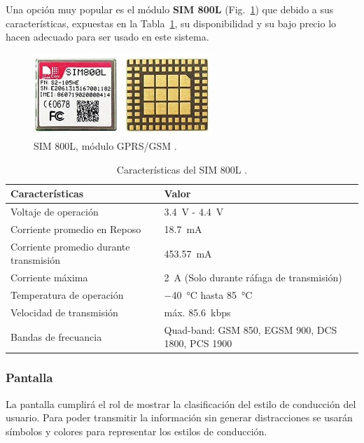Una opción muy popular es el módulo \textbf{SIM 800L} (Fig.~\ref{fig:SIM}) que debido a sus características, expuestas en la Tabla~\ref{diag:SIM}, su disponibilidad y su bajo precio lo hacen adecuado para ser usado en este sistema.

\begin{figure}[hbtp!]
\centering
\includegraphics[width=0.6\textwidth]{SIM800L.jpg}
\caption[SIM 800L, módulo GPRS/GSM]{SIM 800L, módulo GPRS/GSM \cite{SIM800L}.}
\label{fig:SIM}
\end{figure}

\bgroup
\def\arraystretch{1.5}%
\begin{table}[htbp!]
\centering
\caption[Características del SIM 800L]{Características del SIM 800L \cite{SIM800L}.}
\begin{tabular}{@{}p{5.4cm}p{8cm}@{}}
\toprule
Características & Valor \\ \midrule
Voltaje de operación & \SI{3.4}{V} -  \SI{4.4}{V} \\
Corriente promedio en Reposo & \SI{18.7}{mA} \\
Corriente promedio durante \mbox{transmisión} & \SI{453.57}{mA} \\
Corriente máxima & \SI{2}{A} (Solo durante ráfaga de transmisión) \\
Temperatura de operación & \SI{-40}{\celsius} hasta \SI{85}{\celsius} \\
Velocidad de transmisión & máx. \SI{85.6}{kbps} \\
Bandas de frecuancia & Quad-band: GSM 850, EGSM 900, DCS 1800, PCS 1900 \\ \bottomrule
\end{tabular}
\label{diag:SIM}
\end{table}
\egroup












\subsubsection{Pantalla}
La pantalla cumplirá el rol de mostrar la clasificación del estilo de conducción del usuario. Para poder transmitir la información sin generar distracciones se usarán símbolos y colores para representar los estilos de conducción.

